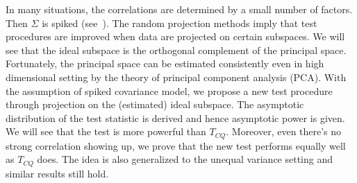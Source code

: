 In many situations, the correlations are determined by a small number of factors.
Then $\Sigma$ is spiked (see~\cite{Cai2012Sparse}).
The random projection methods imply that test procedures are improved when data are projected on certain subspaces.
We will see that the ideal subspace is the orthogonal complement of the principal space.
Fortunately, the principal space can be estimated consistently even in high dimensional setting by the theory of principal component analysis (PCA).
With the assumption of spiked covariance model, we propose a new test procedure through projection on the (estimated) ideal subspace.  
The asymptotic distribution of the test statistic is derived and hence asymptotic power is given.
We will see that the test is more powerful than $T_{CQ}$.
Moreover, even there's no strong correlation showing up, we prove that the new test performs equally well as $T_{CQ}$ does. The idea is also generalized to the unequal variance setting and similar results still hold.





